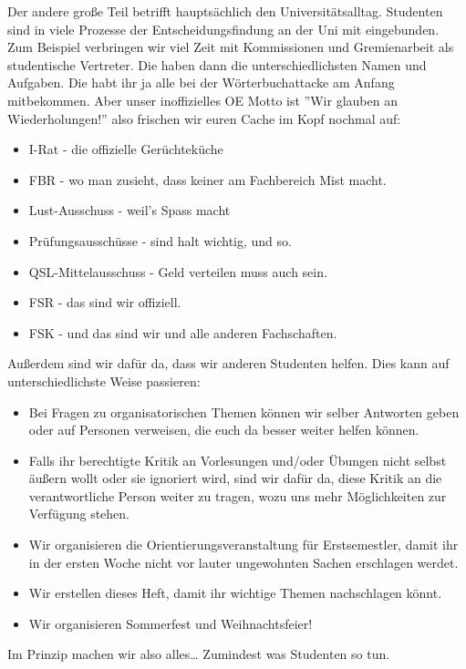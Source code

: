     Der andere große Teil betrifft hauptsächlich den Universitätsalltag.
    Studenten sind in viele Prozesse der Entscheidungsfindung an der Uni
    mit eingebunden.
    Zum Beispiel verbringen wir viel Zeit mit Kommissionen und Gremienarbeit als studentische Vertreter.
    Die haben dann die unterschiedlichsten Namen und Aufgaben.
    Die habt ihr ja alle bei der W\"orterbuchattacke am Anfang mitbekommen.
    Aber unser inoffizielles OE Motto ist ''Wir glauben an Wiederholungen!'' also frischen wir euren Cache im Kopf nochmal auf:
    \begin{itemize}
        \item I-Rat - die offizielle Ger\"uchtek\"uche
        \item FBR - wo man zusieht, dass keiner am Fachbereich Mist macht.
        \item Lust-Ausschuss - weil's Spass macht
        \item Prüfungsausschüsse - sind halt wichtig, und so.
        \item QSL-Mittelausschuss - Geld verteilen muss auch sein.
        \item FSR - das sind wir offiziell.
        \item FSK - und das sind wir und alle anderen Fachschaften.
    \end{itemize}
    Au{\ss}erdem sind wir daf\"ur da, dass wir anderen Studenten helfen. Dies kann auf unterschiedlichste Weise passieren:
    \begin{itemize}
        \item Bei Fragen zu organisatorischen Themen können wir selber Antworten geben oder auf Personen verweisen, die euch da besser weiter helfen können.
        \item Falls ihr berechtigte Kritik an Vorlesungen und/oder Übungen nicht selbst äußern wollt oder sie ignoriert wird, sind wir dafür da, diese Kritik an die verantwortliche Person weiter zu tragen, wozu uns mehr Möglichkeiten zur Verfügung stehen.
        \item Wir organisieren die Orientierungsveranstaltung für Erstsemestler, damit ihr in der ersten Woche nicht vor lauter ungewohnten Sachen erschlagen werdet.
        \item Wir erstellen dieses Heft, damit ihr wichtige Themen nachschlagen könnt.
        \item Wir organisieren Sommerfest und Weihnachtsfeier!
    \end{itemize}
    Im Prinzip machen wir also alles\dots\hspace{1cm} Zumindest was Studenten so tun.
    


